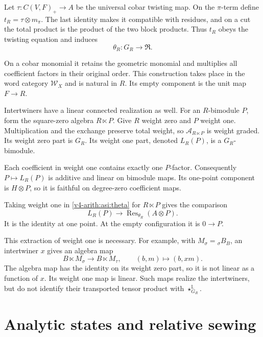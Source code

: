 Let $\tau:C(V,F)_+\to A$ be the universal cobar twisting map. On the
$\pi$-term define $t_R=\tau\otimes m_\pi$. The last identity makes it
compatible with residues, and on a cut the total product is the product
of the two block products. Thus $t_R$ obeys the twisting equation and
induces
\begin{equation}\label{v4-arith:asi:theta}
 \theta_R:G_R\longrightarrow\mathfrak R.
\end{equation}

On a cobar monomial it retains the geometric monomial and multiplies
all coefficient factors in their original order. This construction takes
place in the word category $\mathcal W_X$ and is natural in $R$.
Its empty component is the unit map $F\to R$.

Intertwiners have a linear connected realization as well. For an
$R$-bimodule $P$, form the square-zero algebra $R\ltimes P$.
Give $R$ weight zero and $P$ weight one. Multiplication and the exchange
preserve total weight, so $\mathcal A_{R\ltimes P}$ is weight graded.
Its weight zero part is $G_R$. Its weight one part, denoted
$L_R(P)$, is a $G_R$-bimodule.

Each coefficient in weight one contains
exactly one $P$-factor. Consequently $P\mapsto L_R(P)$ is additive and
linear on bimodule maps. Its one-point component is $H\otimes P$, so
it is faithful on degree-zero coefficient maps.

Taking weight one in
\eqref{v4-arith:asi:theta} for $R\ltimes P$ gives the comparison
\begin{equation}\label{v4-arith:asi:tangent-comparison}
 L_R(P)\longrightarrow\operatorname{Res}_{\theta_R}(A\otimes P).
\end{equation}
It is the identity at one point. At the empty configuration it is $0\to P$.

This extraction of weight one is necessary. For example, with
$M_\sigma={}_\sigma B_B$, an intertwiner $x$ gives an algebra map
\[
 B\ltimes M_\sigma\longrightarrow B\ltimes M_\tau,\qquad
 (b,m)\longmapsto(b,xm).
\]
The algebra map has the identity on its weight zero part, so it is not
linear as a function of $x$. Its weight one map is linear. Such maps
realize the intertwiners, but do not identify their transported tensor
product with $\star^{\mathbb L}_{G_R}$.

\section{Analytic states and relative sewing}
\label{v4-arith:asi:sec:analytic}

